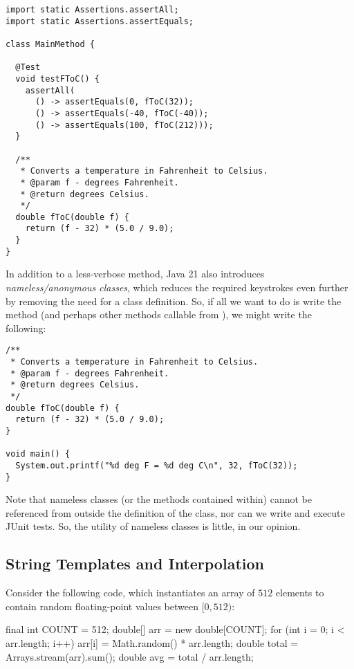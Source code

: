 \begin{lstlisting}[language=MyJava]
import static Assertions.assertAll;
import static Assertions.assertEquals;

class MainMethod {

  @Test
  void testFToC() {
    assertAll(
      () -> assertEquals(0, fToC(32));
      () -> assertEquals(-40, fToC(-40));
      () -> assertEquals(100, fToC(212)));
  }
  
  /**
   * Converts a temperature in Fahrenheit to Celsius.
   * @param f - degrees Fahrenheit.
   * @return degrees Celsius.
   */
  double fToC(double f) {
    return (f - 32) * (5.0 / 9.0); 
  }
}
\end{lstlisting}

In addition to a less-verbose  method, Java 21 also introduces \emph{nameless/anonymous classes}, which reduces the required keystrokes even further by removing the need for a class definition. So, if all we want to do is write the  method (and perhaps other methods callable from ), we might write the following:

\begin{lstlisting}[language=MyJava]
/**
 * Converts a temperature in Fahrenheit to Celsius.
 * @param f - degrees Fahrenheit.
 * @return degrees Celsius.
 */
double fToC(double f) {
  return (f - 32) * (5.0 / 9.0); 
}

void main() {
  System.out.printf("%d deg F = %d deg C\n", 32, fToC(32));
}
\end{lstlisting}

Note that nameless classes (or the methods contained within) cannot be referenced from outside the definition of the class, nor can we write and execute JUnit tests. So, the utility of nameless classes is little, in our opinion.

\subsection{String Templates and Interpolation}

Consider the following code, which instantiates an array of $512$ elements to contain random floating-point values between $[0, 512)$:

\begin{verbnobox}[\small]
final int COUNT = 512;
double[] arr = new double[COUNT];
for (int i = 0; i < arr.length; i++) {
  arr[i] = Math.random() * arr.length;
}
double total = Arrays.stream(arr).sum();
double avg = total / arr.length;
\end{verbnobox}

